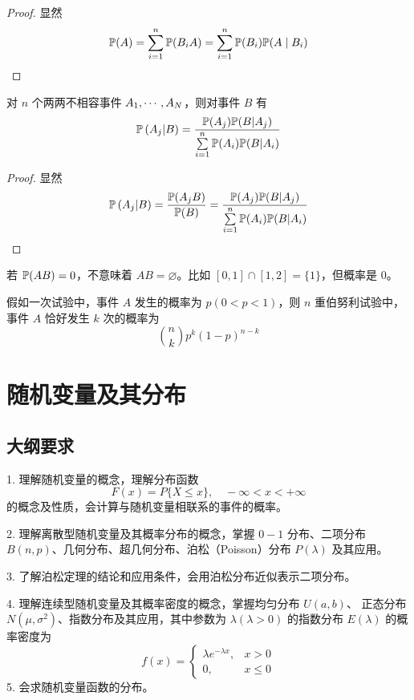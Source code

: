 \begin{proof}
	显然
	\[ \mathbb{P}(A) = \sum_{i=1}^n \mathbb{P}(B_i A) = \sum_{i=1}^n \mathbb{P}(B_i)\mathbb{P}(A \mid B_i) \]
\end{proof}


\begin{theorem}[贝叶斯公式]
	对 $n$ 个两两不相容事件 $A_1,\cdots,A_N$，则对事件 $B$ 有
	\[ \mathbb{P}\left(A_j | B\right) = \frac{\mathbb{P}(A_j)\mathbb{P}(B | A_j)}{\sum\limits_{i=1}^n \mathbb{P}(A_i)\mathbb{P}(B | A_i) } \]
\end{theorem}

\begin{proof}
	显然
	\[ \mathbb{P}\left(A_j | B\right) = \frac{\mathbb{P}(A_j B)}{\mathbb{P}(B)} = \frac{\mathbb{P}(A_j)\mathbb{P}(B | A_j)}{\sum\limits_{i=1}^n \mathbb{P}(A_i)\mathbb{P}(B | A_i) } \]
\end{proof}

\begin{note}
	若 $\mathbb{P}(AB) = 0$，不意味着 $AB = \varnothing$。比如 $[0,1]\cap [1,2] = \{1\}$，但概率是 $0$。
\end{note}


\begin{theorem}[伯努利定理]
	假如一次试验中，事件 $A$ 发生的概率为 $p(0 < p < 1)$，则 $n$ 重伯努利试验中，事件 $A$ 恰好发生 $k$ 次的概率为
	\[ \binom{n}{k} p^k (1 - p)^{n-k} \]
\end{theorem}

\section{随机变量及其分布}

\subsection{大纲要求}

1. 理解随机变量的概念，理解分布函数
\[ F(x) = P\{X \leqslant x\}, \quad -\infty < x < +\infty \]
的概念及性质，会计算与随机变量相联系的事件的概率。

2. 理解离散型随机变量及其概率分布的概念，掌握 $0-1$ 分布、二项分布 $B(n, p)$、几何分布、超几何分布、泊松（Poisson）分布 $P(\lambda)$ 及其应用。

3. 了解泊松定理的结论和应用条件，会用泊松分布近似表示二项分布。

4. 理解连续型随机变量及其概率密度的概念，掌握均匀分布 $U(a, b)$、 正态分布 $N(\mu, \sigma^2)$、指数分布及其应用，其中参数为 $\lambda(\lambda > 0)$ 的指数分布 $E(\lambda)$ 的概率密度为
\[ f(x) = \begin{cases} \lambda e^{-\lambda x}, & x > 0 \\ 0, &x \leqslant 0 \end{cases} \]
5. 会求随机变量函数的分布。

